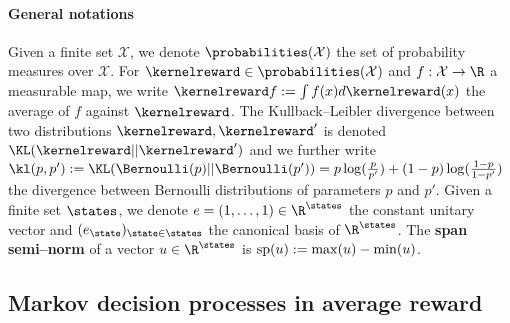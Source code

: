 \documentclass[preprint,cleveref,12pt]{colt2025}
\DeclarePairedDelimiter{\parens}{(}{)}	%
\def\integral{\int}
\newcommand{\vecspan}[1]{\mathrm{sp}\parens{#1}}
\def\kerrew{\kernelreward}
\newcommand{\strong}[1]{\textbf{#1}}
\begin{document}
    \paragraph{General notations}
    Given a finite set $\mathcal{X}$, we denote $\probabilities(\mathcal{X})$ the set of probability measures over $\mathcal{X}$.
    For $\kerrew \in \probabilities(\mathcal{X})$ and $f : \mathcal{X} \to \R$ a measurable map, we write $\kerrew f := \integral f(x) d\kerrew(x)$ the average of $f$ against $\kerrew$. 
    The Kullback--Leibler divergence between two distributions $\kerrew, \kerrew'$ is denoted $\KL(\kerrew||\kerrew')$ and we further write $\kl(p,p') := \KL(\Bernoulli(p)||\Bernoulli(p')) = p \log(\frac p{p'}) + (1-p) \log(\frac{1-p}{1-p'})$ the divergence between Bernoulli distributions of parameters $p$ and $p'$. 
    Given a finite set $\states$, we denote $e = (1, \ldots, 1) \in \R^\states$ the constant unitary vector and $(e_\state)_{\state \in \states}$ the canonical basis of $\R^\states$. 
    The \strong{span semi--norm} of a vector $u \in \R^\states$ is $\vecspan{u} := \max(u) - \min(u)$. 

    \subsection{Markov decision processes in average reward}
\end{document}
